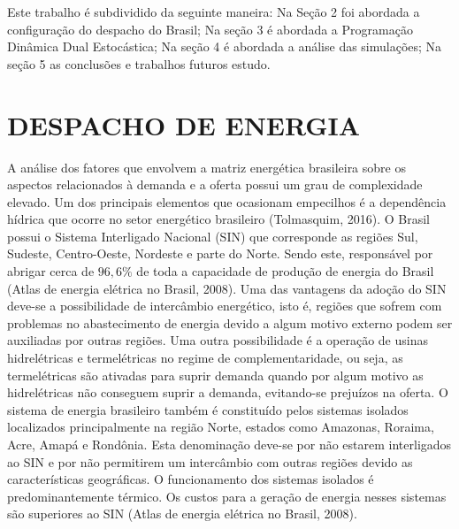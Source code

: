 \documentclass[12pt,fleqn]{article}
\begin{document}
 Este trabalho \'e
subdividido da seguinte maneira: Na Se\c c\~ao 2 foi abordada a configura\c c\~ao do despacho do Brasil; Na se\c c\~ao 3
\'e abordada a Programa\c c\~ao Din\^amica Dual Estoc\'astica; Na se\c c\~ao 4 \'e abordada a an\'alise das simula\c
c\~oes; Na se\c c\~ao 5 as conclus\~oes e trabalhos futuros estudo. 

\section{DESPACHO DE ENERGIA}
A an\'alise dos fatores que envolvem a matriz energ\'etica brasileira sobre os aspectos relacionados \`a demanda e a oferta possui um grau de complexidade elevado. Um dos principais elementos que ocasionam empecilhos \'e a depend\^encia h\'idrica que ocorre no setor energ\'etico brasileiro (Tolmasquim, 2016). O Brasil possui o Sistema Interligado Nacional (SIN) que corresponde as
regi\~oes Sul, Sudeste, Centro-Oeste, Nordeste e parte do Norte. Sendo este, respons\'avel por abrigar cerca de $96,6\%$ de toda a capacidade de produ\c c\~ao de energia do Brasil (Atlas de
energia el\'etrica no Brasil, 2008). Uma das vantagens da ado\c c\~ao do SIN deve-se a possibilidade de interc\^ambio
energ\'etico, isto \'e, regi\~oes que sofrem com problemas no abastecimento  de energia devido a algum motivo externo
podem ser auxiliadas por outras regi\~oes. Uma outra possibilidade \'e a opera\c c\~ao de usinas hidrel\'etricas e termel\'etricas no
regime de complementaridade, ou seja, as termel\'etricas s\~ao ativadas para suprir demanda quando por algum motivo as
hidrel\'etricas n\~ao conseguem suprir a demanda, evitando-se preju\'izos na oferta. O sistema de energia brasileiro tamb\'em \'e constitu\'ido pelos sistemas isolados localizados principalmente na regi\~ao Norte,
estados como Amazonas, Roraima, Acre, Amap\'a e Rond\^onia. Esta denomina\c c\~ao deve-se por n\~ao estarem interligados ao
SIN e por n\~ao permitirem um interc\^ambio com outras regi\~oes devido as caracter\'isticas geogr\'aficas. O
funcionamento dos
sistemas isolados \'e predominantemente t\'ermico. Os custos para a gera\c c\~ao de energia nesses sistemas s\~ao
superiores ao SIN (Atlas de
energia el\'etrica no Brasil, 2008).
\end{document}
